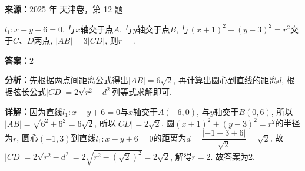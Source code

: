\begin{question}[points=5]
\textbf{来源：}2025 年 天津卷，第 12 题\par
$l_1: x - y + 6 = 0$, 与$x$轴交于点$A$, 与$y$轴交于点$B$, 与$(x+1)^2 + (y-3)^2 = r^2$交于$C$、$D$两点, $|AB| = 3|CD|$, 则$r = $.
\fillin[{$2$}]
\begin{solution}
\textbf{答案：}$2$

\textbf{分析：}先根据两点间距离公式得出$|AB| = 6\sqrt{2}$, 再计算出圆心到直线的距离$d$, 根据弦长公式$|CD| = 2\sqrt{r^2 - d^2}$列等式求解即可.

\textbf{详解：}因为直线$l_1: x - y + 6 = 0$与$x$轴交于$A(-6,0)$, 与$y$轴交于$B(0,6)$, 所以$|AB| = \sqrt{6^2 + 6^2} = 6\sqrt{2}$, 所以$|CD| = 2\sqrt{2}$. 圆$(x+1)^2 + (y-3)^2 = r^2$的半径为$r$, 圆心$(-1,3)$到直线$l_1: x - y + 6 = 0$的距离为$d = \dfrac{|-1 - 3 + 6|}{\sqrt{2}} = \sqrt{2}$, 故$|CD| = 2\sqrt{r^2 - d^2} = 2\sqrt{r^2 - (\sqrt{2})^2} = 2\sqrt{2}$, 解得$r=2$. 故答案为2.
\end{solution}
\end{question}

